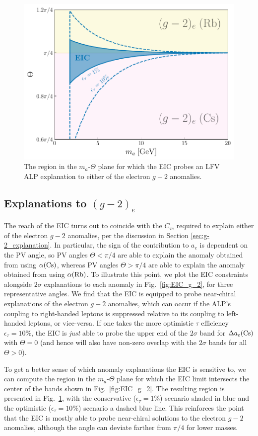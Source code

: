\begin{figure}[t!]
    \centering
    \includegraphics[width=0.6\linewidth]{figures/chapter5/EIC_g_2_probe.pdf}
    \caption[Region in the $m_a$-$\Theta$ plane for which the EIC probes an LFV ALP explanation to either of the electron $g-2$ anomalies.]{The region in the $m_a$-$\Theta$ plane for which the EIC probes an LFV ALP explanation to either of the electron $g-2$ anomalies.}
    \label{fig:EIC_g_2_region}
\end{figure}

\subsection{Explanations to $(g-2)_e$}\label{sec:EIC_ALP_g_2}

The reach of the EIC turns out to coincide with the $C_{\tau e}$ required to explain either of the electron $g-2$ anomalies, per the discussion in Section \ref{sec:g-2_explanation}. In particular, the sign of the contribution to $a_e$ is dependent on the PV angle, so PV angles $\Theta < \pi/4$ are able to explain the anomaly obtained from using $\alpha({\rm Cs})$, whereas PV angles $\Theta > \pi/4$ are able to explain the anomaly obtained from using $\alpha({\rm Rb})$. To illustrate this point, we plot the EIC constraints alongside $2\sigma$ explanations to each anomaly in Fig.~\ref{fig:EIC_g_2}, for three representative angles. We find that the EIC is equipped to probe near-chiral explanations of the electron $g-2$ anomalies, which can occur if the ALP's coupling to right-handed leptons is suppressed relative to its coupling to left-handed leptons, or vice-versa. If one takes the more optimistic $\tau$ efficiency $\epsilon_\tau = 10\%$, the EIC is {\it just} able to probe the upper end of the $2\sigma$ band for $\Delta a_e{(\rm Cs)}$ with $\Theta = 0$ (and hence will also have non-zero overlap with the $2\sigma$ bands for all $\Theta > 0$).


To get a better sense of which anomaly explanations the EIC is sensitive to, we can compute the region in the $m_a$-$\Theta$ plane for which the EIC limit intersects the center of the bands shown in Fig.~\ref{fig:EIC_g_2}. The resulting region is presented in Fig.~\ref{fig:EIC_g_2_region}, with the conservative ($\epsilon_\tau = 1\%$) scenario shaded in blue and the optimistic ($\epsilon_\tau = 10\%$) scenario a dashed blue line. This reinforces the point that the EIC is mostly able to probe near-chiral solutions to the electron $g-2$ anomalies, although the angle can deviate farther from $\pi/4$ for lower masses.


